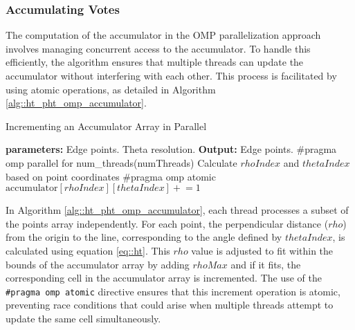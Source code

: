\documentclass[conference]{IEEEtran}
\begin{document}
        \subsubsection{Accumulating Votes}
        \label{subsec:omp_accumulating_votes}
    
            The computation of the accumulator in the OMP parallelization approach involves managing concurrent access to the accumulator. To handle this efficiently, the algorithm ensures that multiple threads can update the accumulator without interfering with each other. This process is facilitated by using atomic operations, as detailed in Algorithm \ref{alg::ht_pht_omp_accumulator}.
    
            \begin{algorithm}
            \caption{Incrementing an Accumulator Array in Parallel}
            \label{alg::ht_pht_omp_accumulator}
            \begin{algorithmic}[1]
           \State \textbf{parameters:}
            \State \hspace{\algorithmicindent} Edge points.
            \State \hspace{\algorithmicindent} Theta resolution.
            \State \textbf{Output:} Edge points.
                \State \#pragma omp parallel for num\_threads(numThreads)
                    \State Calculate $rhoIndex$ and $thetaIndex$ based on point coordinates
                    \State \#pragma omp atomic
                    \State $\text{accumulator}[rhoIndex][thetaIndex] \mathrel{+}= 1$
                \EndFor
            \EndProcedure
            \end{algorithmic}
            \end{algorithm}
            
            In Algorithm \ref{alg::ht_pht_omp_accumulator}, each thread processes a subset of the points array independently. For each point, the perpendicular distance ($rho$) from the origin to the line, corresponding to the angle defined by $thetaIndex$, is calculated using equation \ref{eq::ht}. This $rho$ value is adjusted to fit within the bounds of the accumulator array by adding $rhoMax$ and if it fits, the corresponding cell in the accumulator array is incremented. The use of the \texttt{\#pragma omp atomic} directive ensures that this increment operation is atomic, preventing race conditions that could arise when multiple threads attempt to update the same cell simultaneously.
        
\end{document}
